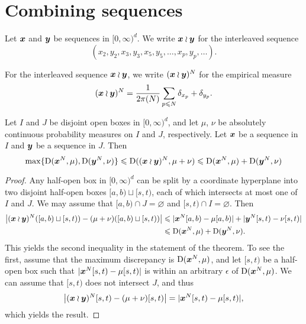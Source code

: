 \section{Combining sequences}

\begin{definition}
Let ${\boldsymbol x}$ and ${\boldsymbol y}$ be sequences in $[0,\infty)^d$. We write ${\boldsymbol x}\wr{\boldsymbol y}$ for 
the interleaved sequence 
\[
	(x_2,y_2,x_3,y_3,x_5,y_5,\dots,x_p,y_p,\dots) .
\]
\end{definition}

For the interleaved sequence ${\boldsymbol x}\wr{\boldsymbol y}$, we write $({\boldsymbol x}\wr{\boldsymbol y})^N$ for the 
empirical measure 
\[
	({\boldsymbol x}\wr{\boldsymbol y})^N = \frac{1}{2\pi(N)} \sum_{p\leqslant N} \delta_{x_p} + \delta_{y_p} .
\]

\begin{theorem}
Let $I$ and $J$ be disjoint open boxes in $[0,\infty)^d$, and let $\mu$, 
$\nu$ be absolutely continuous probability measures on $I$ and $J$, 
respectively. Let ${\boldsymbol x}$ be a sequence in $I$ and ${\boldsymbol y}$ be a sequence in $J$. 
Then 
\[
	\max\{\operatorname{D}({\boldsymbol x}^N,\mu),\operatorname{D}({\boldsymbol y}^N,\nu)\} \leqslant \operatorname{D}(({\boldsymbol x}\wr{\boldsymbol y})^N, \mu+\nu) \leqslant \operatorname{D}({\boldsymbol x}^N,\mu) + \operatorname{D}({\boldsymbol y}^N,\nu)
\]
\end{theorem}
\begin{proof}
Any half-open box in $[0,\infty)^d$ can be split by a coordinate 
hyperplane into two disjoint half-open boxes $[a,b)\sqcup [s,t)$, each of which 
intersects at most one of $I$ and $J$. We may assume that 
$[a,b)\cap J=\varnothing$ and $[s,t)\cap I = \varnothing$. Then 
\begin{align*}
	\left| ({\boldsymbol x}\wr{\boldsymbol y})^N([a,b)\sqcup [s,t)) - (\mu+\nu)([a,b)\sqcup[s,t))\right| 
		&\leqslant |{\boldsymbol x}^N[a,b) - \mu[a,b)| + |{\boldsymbol y}^N[s,t) - \nu[s,t)| \\
		&\leqslant \operatorname{D}({\boldsymbol x}^N,\mu) + \operatorname{D}({\boldsymbol y}^N,\nu) .
\end{align*}
This yields the second inequality in the statement of the theorem. To see the 
first, assume that the maximum discrepancy is $\operatorname{D}({\boldsymbol x}^N,\mu)$, and let 
$[s,t)$ be a half-open box such that $|{\boldsymbol x}^N[s,t) - \mu[s,t)|$ is within an 
arbitrary $\epsilon$ of $\operatorname{D}({\boldsymbol x}^N,\mu)$. We can assume that $[s,t)$ does not 
intersect $J$, and thus 
\[
	\left|({\boldsymbol x}\wr{\boldsymbol y})^N[s,t) - (\mu+\nu)[s,t)\right| = |{\boldsymbol x}^N[s,t) - \mu[s,t)| ,
\]
which yields the result. 
\end{proof}
